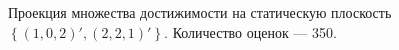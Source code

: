 \documentclass[10pt, a4paper]{article}
\begin{document}
\begin{figure}[H]
\caption{Проекция множества достижимости на статическую плоскость $\left\{(1,0,2)',(2,2,1)'\right\}$. Количество оценок --- 350.}
\end{figure}
\end{document}
